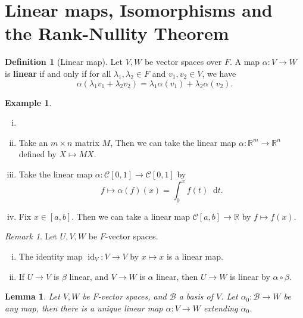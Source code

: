 \documentclass[12pt]{article}
\DeclareMathOperator{\id}{id}
\newcommand{\diff}{\mathop{}\!\mathrm{d}}
\newtheorem{lemma}{Lemma}[section]
\theoremstyle{definition}
\newtheorem{definition}{Definition}[section]
\newtheorem{example}{Example}[section]
\theoremstyle{remark}
\newtheorem*{remark}{Remark}
\begin{document}
\newpage

\section{Linear maps, Isomorphisms and the Rank-Nullity Theorem}%
\label{sec:linear_maps_isomorphism_and_the_rank_nullity_theorem}

\begin{definition}[Linear map]
	Let $V, W$ be vector spaces over $F$. A map $\alpha : V \to W$ is \textbf{linear} if and only if for all $\lambda_1, \lambda_2 \in F$ and $v_1, v_2 \in V$, we have
	\[
		\alpha(\lambda_1 v_1 + \lambda_2 v_2) = \lambda_1 \alpha(v_1) + \lambda_2 \alpha(v_2)
	.\]
\end{definition}

\begin{adjustbox}{minipage = \columnwidth - 25.5pt, margin=1em, frame=1pt, margin=0em}
\begin{example}
	\begin{enumerate}[(i)]
		\item[]
		\item Take an $m \times n$ matrix $M$, Then we can take the linear map $\alpha : \mathbb{R}^{m} \to \mathbb{R}^{n}$ defined by $X \mapsto M X$.
		\item Take the linear map $\alpha : \mathcal{C}[0, 1] \to \mathcal{C}[0, 1]$ by
			\[
				f \mapsto \alpha(f)(x) = \int_{0}^{x}f(t)\diff t
			.\]
		\item Fix $x \in [a, b]$. Then we can take a linear map $\mathcal{C}[a, b] \to \mathbb{R}$ by $f \mapsto f(x)$.
	\end{enumerate}
	
\end{example}

\end{adjustbox}

\begin{remark}
	Let $U, V, W$ be $F$-vector spaces.
	\begin{enumerate}[(i)]
		\item The identity map $\id_V : V \to V$ by $x \mapsto x$ is a linear map.
		\item If $U \to V$ is $\beta$ linear, and $V \to W$ is $\alpha$ linear, then $U \to W$ is linear by $\alpha \circ \beta$.
	\end{enumerate}
\end{remark}

\begin{lemma}
	Let $V, W$ be $F$-vector spaces, and $\mathcal{B}$ a basis of $V$. Let $\alpha_0 : \mathcal{B} \to W$ be any map, then there is a unique linear map $\alpha : V \to W$ extending $\alpha_0$.
\end{lemma}
\end{document}
